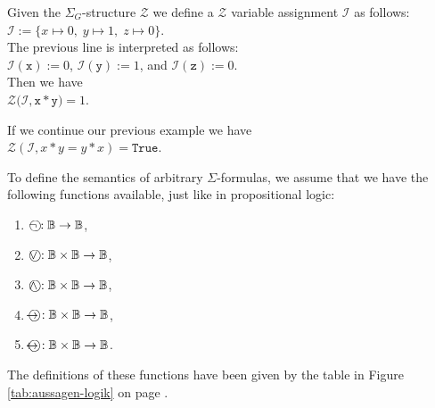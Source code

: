 \exampleEng
Given the $\Sigma_G$-structure
$\mathcal{Z}$ we define a $\mathcal{Z}$ variable assignment $\mathcal{I}$ as follows:
\\[0.2cm]
\hspace*{1.3cm} $\mathcal{I} := \bigl\{ x \mapsto 0,\; y \mapsto 1,\; z \mapsto 0\bigr\}$.
\\[0.2cm]
The previous line is interpreted as follows:
\\[0.2cm]
\hspace*{1.3cm} $\mathcal{I}(\mathtt{x}) := 0$, \quad $\mathcal{I}(\mathtt{y}) := 1$, \quad and \quad $\mathcal{I}(\mathtt{z}) := 0$.
\\[0.2cm]
Then we have  \\[0.2cm]
\hspace*{1.3cm}  $\mathcal{Z}\bigl(\mathcal{I}, \mathtt{x} * \mathtt{y} \bigr) = 1$. \eox



\exampleEng
If we continue our previous example we have
\\[0.2cm]
\hspace*{1.3cm} 
$\mathcal{Z}(\mathcal{I},x * y = y * x) = \mathtt{True}$.
\eox

To define the semantics of arbitrary $\Sigma$-formulas, we assume that we have the following functions
available, just like in propositional logic: 
\begin{enumerate}
\item $\circneg: \mathbb{B} \rightarrow \mathbb{B}$,
\item $\circvee: \mathbb{B} \times \mathbb{B} \rightarrow \mathbb{B}$,
\item $\circwedge: \mathbb{B} \times \mathbb{B} \rightarrow \mathbb{B}$,
\item $\circright: \mathbb{B} \times \mathbb{B} \rightarrow \mathbb{B}$,
\item $\circleftright: \mathbb{B} \times \mathbb{B} \rightarrow \mathbb{B}$.
\end{enumerate}
The definitions of these functions have been given by the table in Figure \ref{tab:aussagen-logik} on page
\pageref{tab:aussagen-logik}.

